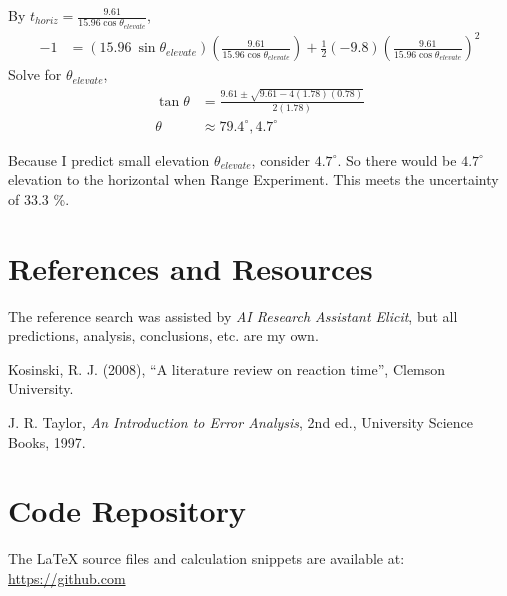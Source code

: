 \documentclass[12pt]{article}
\begin{document}
\begin{enumerate}[label=(\alph*), leftmargin=1.2cm]
    By $t_{horiz} = \frac{9.61} {15.96\cos\theta_{elevate}}$,
    \[
    \begin{aligned}
    -1 &= (15.96~\sin\theta_{elevate})\left(\frac{9.61} {15.96\cos\theta_{elevate}}\right) +\tfrac12(-9.8)\left(\frac{9.61} {15.96\cos\theta_{elevate}}\right)^2
    \end{aligned}
    \]
    \vspace{1em}
    Solve for $\theta_{elevate}$,
    \[
    \begin{aligned}
    \tan\theta&=\frac{9.61\pm\sqrt{9.61-4(1.78)(0.78)}}{2(1.78)} \\
    \theta &\approx 79.4^{\circ}, 4.7^{\circ}
    \end{aligned}
    \]

    \vspace{1em}

    Because I predict small elevation $\theta_{elevate}$, consider $4.7^{\circ}$. So there would be $4.7^{\circ}$ elevation to the horizontal when Range Experiment. This meets the uncertainty of 33.3 \%. 
    
  
\end{enumerate}

\newpage
\section{References and Resources}

The reference search was assisted by \emph{AI Research Assistant Elicit}, but all predictions, analysis, conclusions, etc. are my own.
\begin{thebibliography}{9}

Kosinski, R. J. (2008), ``A literature review on reaction time'', Clemson University. 

J. R. Taylor, \emph{An Introduction to Error Analysis}, 
2nd ed., University Science Books, 1997.

\end{thebibliography}


\section*{Code Repository}
\vspace{0.5em}
The LaTeX source files and calculation snippets are available at:  
\url{https://github.com}
\end{document}
